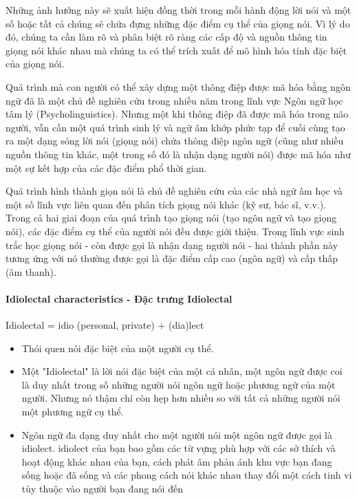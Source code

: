 \documentclass{article}
\begin{document}
	Những ảnh hưởng này sẽ xuất hiện đồng thời trong mỗi hành động lời nói và một số hoặc tất cả chúng sẽ chứa đựng những đặc điểm cụ thể của giọng nói. Vì lý do đó, chúng ta cần làm rõ và phân biệt rõ ràng các cấp độ và nguồn thông tin giọng nói khác nhau mà chúng ta có thể trích xuất để mô hình hóa tính đặc biệt của giọng nói.
	
	Quá trình mà con người có thể xây dựng một thông điệp được mã hóa bằng ngôn ngữ đã là một chủ đề nghiên cứu trong nhiều năm trong lĩnh vực Ngôn ngữ học tâm lý (Psycholinguistics). Nhưng một khi thông điệp đã được mã hóa trong não người, vẫn cần một quá trình sinh lý và ngữ âm khớp phức tạp để cuối cùng tạo ra một dạng sóng lời nói (giọng nói) chứa thông điệp ngôn ngữ (cũng như nhiều nguồn thông tin khác, một trong số đó là nhận dạng người nói) được mã hóa như một sự kết hợp của các đặc điểm phổ thời gian. 
	
	Quá trình hình thành giọn nói là chủ đề nghiên cứu của các nhà ngữ âm học và một số lĩnh vực liên quan đến phân tích giọng nói khác (kỹ sư, bác sĩ, v.v.). Trong cả hai giai đoạn của quá trình tạo giọng nói (tạo ngôn ngữ và tạo giọng nói), các đặc điểm cụ thể của người nói đều được giới thiệu. Trong lĩnh vực sinh trắc học giọng nói - còn được gọi là nhận dạng người nói - hai thành phần này tương ứng với nó thường được gọi là đặc điểm cấp cao (ngôn ngữ) và cấp thấp (âm thanh).
	
	\paragraph{Idiolectal characteristics - Đặc trưng Idiolectal}
	Idiolectal = idio (personal, private) + (dia)lect
	\begin{itemize}
		\item Thói quen nói đặc biệt của một người cụ thể.
		\item Một "Idiolectal" là lời nói đặc biệt của một cá nhân, một ngôn ngữ được coi là duy nhất trong số những người nói ngôn ngữ hoặc phương ngữ của một người. Nhưng nó thậm chí còn hẹp hơn nhiều so với tất cả những người nói một phương ngữ cụ thể.
		\item Ngôn ngữ đa dạng duy nhất cho một người nói một ngôn ngữ được gọi là idiolect. idiolect của bạn bao gồm các từ vựng phù hợp với các sở thích và hoạt động khác nhau của bạn, cách phát âm phản ánh khu vực bạn đang sống hoặc đã sống và các phong cách nói khác nhau thay đổi một cách tinh vi tùy thuộc vào người bạn đang nói đến
	\end{itemize}
	
\end{document}
